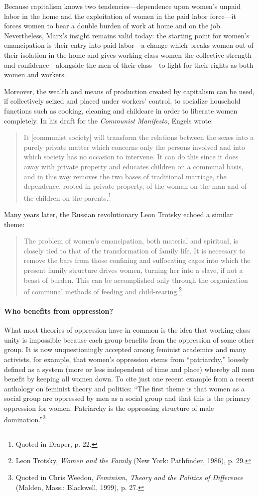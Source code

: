 Because capitalism knows two tendencies---dependence upon women's unpaid labor in the home and the exploitation of women in the paid labor force---it forces women to bear a double burden of work at home and on the job. Nevertheless, Marx's insight remains valid today: the starting point for women's emancipation is their entry into paid labor---a change which breaks women out of their isolation in the home and gives working-class women the collective strength and confidence---alongside the men of their class---to fight for their rights as both women and workers.

Moreover, the wealth and means of production created by capitalism can be used, if collectively seized and placed under workers' control, to socialize household functions such as cooking, cleaning and childcare in order to liberate women completely. In his draft for the \emph{Communist Manifesto}, Engels wrote:

\blockquote{It [communist society] will transform the relations between the sexes into a purely private matter which concerns only the persons involved and into which society has no occasion to intervene. It can do this since it does away with private property and educates children on a communal basis, and in this way removes the two bases of traditional marriage, the dependence, rooted in private property, of the woman on the man and of the children on the parents.\footnote{Quoted in Draper, p. 22.}}

Many years later, the Russian revolutionary Leon Trotsky echoed a similar theme:

\blockquote{The problem of women's emancipation, both material and spiritual, is closely tied to that of the transformation of family life. It is necessary to remove the bars from those confining and suffocating cages into which the present family structure drives women, turning her into a slave, if not a beast of burden. This can be accomplished only through the organization of communal methods of feeding and child-rearing.\footnote{Leon Trotsky, \emph{Women and the Family} (New York: Pathfinder, 1986), p. 29.}}

\sectiondivider

\paragraph{Who benefits from oppression?}

What most theories of oppression have in common is the idea that working-class unity is impossible because each group benefits from the oppression of some other group. It is now unquestioningly accepted among feminist academics and many activists, for example, that women's oppression stems from ``patriarchy,'' loosely defined as a system (more or less independent of time and place) whereby all men benefit by keeping all women down. To cite just one recent example from a recent anthology on feminist theory and politics: ``The first theme is that women as a social group are oppressed by men as a social group and that this is the primary oppression for women. Patriarchy is the oppressing structure of male domination.''\footnote{Quoted in Chris Weedon, \emph{Feminism, Theory and the Politics of Difference} (Malden, Mass.: Blackwell, 1999), p. 27.}


